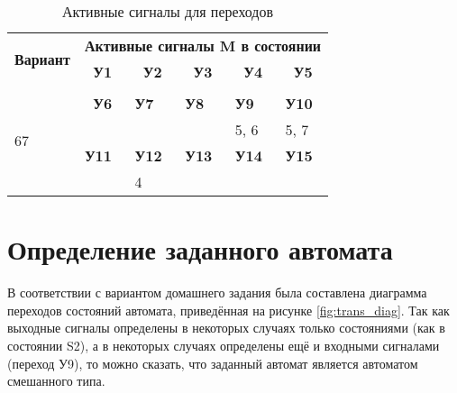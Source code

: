\documentclass[a4paper, 14pt]{article}
\begin{document}
    \begin{table}[H]
        \caption{Активные сигналы для переходов}
        \begin{tabular}{|l|l|l|l|l|l|}
        \hline
        \multicolumn{1}{|c|}{\multirow{2}{*}{\textbf{Вариант}}} & \multicolumn{5}{c|}{\textbf{Активные сигналы M в состоянии}}                                                                                                                 \\ \cline{2-6} 
        \multicolumn{1}{|c|}{}                                  & \multicolumn{1}{c|}{\textbf{У1}} & \multicolumn{1}{c|}{\textbf{У2}} & \multicolumn{1}{c|}{\textbf{У3}} & \multicolumn{1}{c|}{\textbf{У4}} & \multicolumn{1}{c|}{\textbf{У5}} \\ \hline
        \multirow{5}{*}{67}                                     &                                  &                                  &                                  &                                  &                                  \\ \cline{2-6} 
                                                                & \multicolumn{1}{c|}{\textbf{У6}} & \textbf{У7}                      & \textbf{У8}                      & \textbf{У9}                      & \textbf{У10}                     \\ \cline{2-6} 
                                                                &                                  &                                  &                                  & 5, 6                             & 5, 7                             \\ \cline{2-6} 
                                                                & \textbf{У11}                     & \textbf{У12}                     & \textbf{У13}                     & \textbf{У14}                     & \textbf{У15}                     \\ \cline{2-6} 
                                                                &                                  & 4                                &                                  &                                  &                                  \\ \hline
        \end{tabular}
    \end{table}

    \pagebreak

    \section{Определение заданного автомата}
    В соответствии с вариантом домашнего задания была составлена диаграмма переходов состояний автомата, приведённая на рисунке \ref{fig:trans_diag}.
    Так как выходные сигналы определены в некоторых случаях только состояниями (как в состоянии S2), а в некоторых 
    случаях определены ещё и входными сигналами (переход У9), то можно сказать, что заданный автомат является автоматом смешанного типа.
\end{document}
